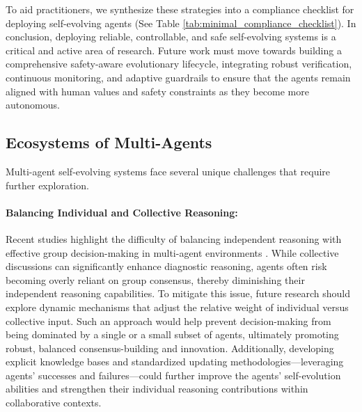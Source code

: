 \documentclass[10pt]{article} %
\begin{document}
To aid practitioners, we synthesize these strategies into a compliance checklist for deploying self-evolving agents (See Table \ref{tab:minimal_compliance_checklist}). In conclusion, deploying reliable, controllable, and safe self-evolving systems is a critical and active area of research. Future work must move towards building a comprehensive safety-aware evolutionary lifecycle, integrating robust verification, continuous monitoring, and adaptive guardrails to ensure that the agents remain aligned with human values and safety constraints as they become more autonomous.





\subsection{Ecosystems of Multi-Agents}
Multi-agent self-evolving systems face several unique challenges that require further exploration.
\paragraph{Balancing Individual and Collective Reasoning:} Recent studies highlight the difficulty of balancing independent reasoning with effective group decision-making in multi-agent environments \citep{chen2025mdteamgpt, sun2025collab}. While collective discussions can significantly enhance diagnostic reasoning, agents often risk becoming overly reliant on group consensus, thereby diminishing their independent reasoning capabilities. To mitigate this issue, future research should explore dynamic mechanisms that adjust the relative weight of individual versus collective input. Such an approach would help prevent decision-making from being dominated by a single or a small subset of agents, ultimately promoting robust, balanced consensus-building and innovation. Additionally, developing explicit knowledge bases and standardized updating methodologies—leveraging agents' successes and failures—could further improve the agents' self-evolution abilities and strengthen their individual reasoning contributions within collaborative contexts.
\end{document}
